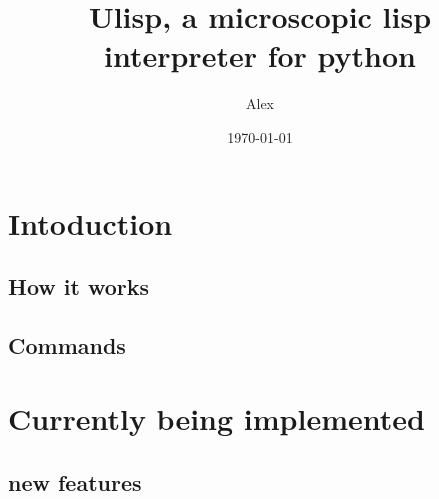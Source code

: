 \documentclass[a4paper,12pt]{article}
\begin{document}
\author{Alex}
\date{\today}
\title{Ulisp, a microscopic lisp interpreter for python}
\maketitle

\section{Intoduction}
\subsection{How it works}
\subsection{Commands}
\section{Currently being implemented}
\subsection{new features}
\end{document}
